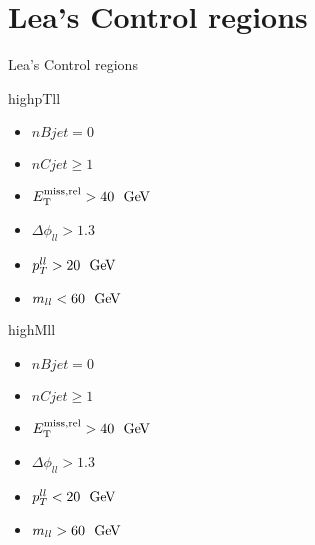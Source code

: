 \documentclass[10pt]{beamer}
\begin{document}
\section{Lea's Control regions}
\begin{frame}{Lea's Control regions}
  
  \begin{block}{highpTll}
    \begin{itemize}    
    \item $nBjet=0$
    \item $nCjet\ge 1$
    \item $\METrel>40 ~\GeV$
    \item $\Delta\phi_{ll}>1.3$
    \item $p_T^{ll}>20~\GeV$
    \item $m_{ll}<60~\GeV$
    \end{itemize}
  \end{block}
  
  \begin{block}{highMll}
    \begin{itemize}    
    \item $nBjet=0$
    \item $nCjet\ge 1$
    \item $\METrel>40 ~\GeV$
    \item $\Delta\phi_{ll}>1.3$
    \item $p_T^{ll}<20~\GeV$
    \item $m_{ll}>60~\GeV$
    \end{itemize}
  \end{block}
  
  
\end{frame}



\end{document}
